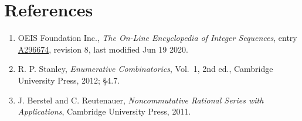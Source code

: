 \documentclass[11pt]{article}
\theoremstyle{definition}
\begin{document}
\section{References}

\begin{enumerate}

\item OEIS Foundation Inc., \emph{The On-Line Encyclopedia of Integer Sequences}, entry \href{https://oeis.org/A296674}{A296674}, revision 8, last modified Jun 19 2020.

\item R. P. Stanley, \emph{Enumerative Combinatorics}, Vol.~1, 2nd ed., Cambridge University Press, 2012; \S4.7.

\item J. Berstel and C. Reutenauer, \emph{Noncommutative Rational Series with Applications}, Cambridge University Press, 2011.

\end{enumerate}
\end{document}
